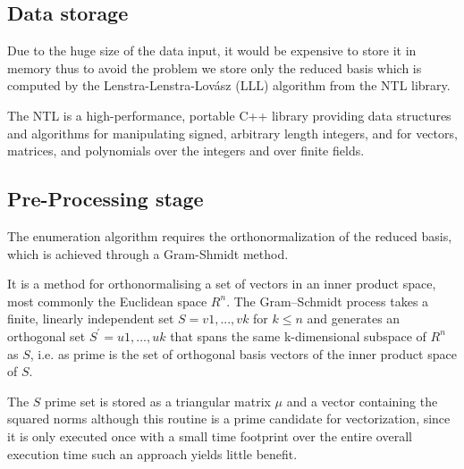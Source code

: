\documentclass[conference]{IEEEtran}
\begin{document}
\subsection{Data storage}
    
    Due to the huge size of the data input, it would be expensive to store it in memory thus to avoid the problem we store only the reduced basis which is computed by the Lenstra-Lenstra-Lovász (LLL) algorithm from the NTL library.
    
    The NTL is a high-performance, portable C++ library providing data structures and algorithms for manipulating signed, arbitrary length integers, and for vectors, matrices, and polynomials over the integers and over finite fields.


\subsection{Pre-Processing stage}

    The enumeration algorithm requires the orthonormalization of the reduced basis, which is achieved through a Gram-Shmidt method.

    It is a method for orthonormalising a set of vectors in an inner product space, most commonly the Euclidean space $R^n$. The Gram–Schmidt process takes a finite, linearly independent set $S = {v1, ..., vk}$ for $k \leqslant n$ and generates an orthogonal set $S^\prime = {u1, ..., uk}$ that spans the same k-dimensional subspace of $R^n$ as $S$, i.e. as prime is the set of orthogonal basis vectors of the inner product space of $S$.
    
    The $S$ prime set is stored as a triangular matrix $\mu$ and a vector containing the squared norms although this routine is a prime candidate for vectorization, since it is only executed once with a small time footprint over the entire overall execution time such an approach yields little benefit.


\end{document}
